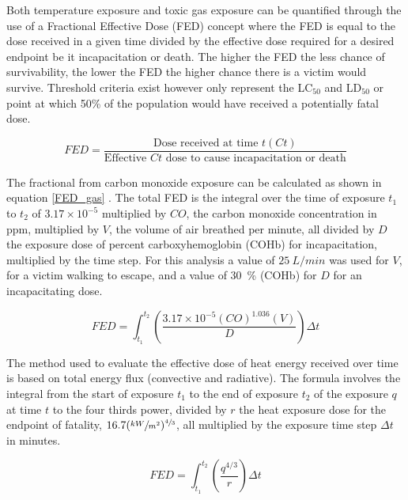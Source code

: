 \documentclass[12pt,oneside]{book}
\begin{document}
Both temperature exposure and toxic gas exposure can be quantified through the use of a Fractional Effective Dose (FED) concept where the FED is equal to the dose received in a given time divided by the effective dose required for a desired endpoint be it incapacitation or death. The higher the FED the less chance of survivability, the lower the FED the higher chance there is a victim would survive. Threshold criteria exist however only represent the LC$_{50}$ and LD$_{50}$ or point at which 50\% of the population would have received a potentially fatal dose.

\begin{equation}
	FED = \frac{\text{Dose received at time } t(Ct)}{\text{Effective } Ct \text{ dose to cause incapacitation or death}}
	\label{FED_general}
\end{equation} 

The fractional from carbon monoxide exposure can be calculated as shown in equation \ref{FED_gas} \cite{SFPE:Purser}. The total FED is the integral over the time of exposure $t_1$ to $t_2$ of $3.17 \times  10^{-5}$ multiplied by $CO$, the carbon monoxide concentration in ppm, multiplied by $V$, the volume of air breathed per minute, all divided by $D$ the exposure dose of percent carboxyhemoglobin (COHb) for incapacitation, multiplied by the time step. For this analysis a value of $25~L/min$ was used for $V$, for a victim walking to escape, and a value of 30~\% (COHb) for $D$ for an incapacitating dose.

\begin{equation}
	FED = \int_{t_1}^{t_2}\left(\frac{3.17 \times 10^{-5} \left(CO\right)^{1.036} \left(V\right)}{D}\right) \Delta t
	\label{FED_gas}
\end{equation}

The method used to evaluate the effective dose of heat energy received over time is based on total energy flux (convective and radiative). The formula involves the integral from the start of exposure $t_1$ to the end of exposure $t_2$ of the exposure $q$ at time $t$ to the four thirds power, divided by $r$ the heat exposure dose for the endpoint of fatality, $16.7(\sfrac{kW}{m^2})^{\sfrac{4}{3}}$, all multiplied by the exposure time step $\Delta t$ in minutes. \cite{SFPE:Purser}

\begin{equation} \label{TotalFlux_FED}
	FED = \int_{t_1}^{t_2} \left( \frac{q^{4/3}}{r} \right) \Delta t
\end{equation}
\end{document}
